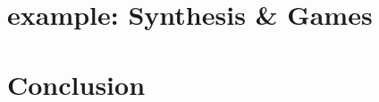 \documentclass{style/smpresentation}
\begin{document}
\section{%
    \texorpdfstring{}{3rd} example:%
    \newline%
    Synthesis%
    \newline%
    \& Games%
}
    
    
    
    
    

\section{Conclusion}
    
    

\appendix
    
\end{document}
